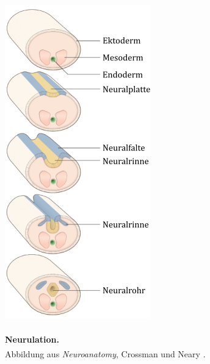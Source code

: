 \documentclass[12pt,a4paper,pdftex]{article}
\begin{document}
\begin{minipage}[b]{0.3\textwidth}
\begin{figure}[H]
    \includegraphics[width=\textwidth]{pictures/Bilder_Jule/Andere/Neurulation_crossm1.png}
    \caption[Neurulation]{\textbf{\\Neurulation.}\\
    Abbildung aus \textit{Neuroanatomy}, Crossman und Neary \textsuperscript{\cite[1]{crossman2014neuroanatomy}}.}
    \label{fig:neurulation}
    \end{figure}    
\end{minipage} 
\end{document}
